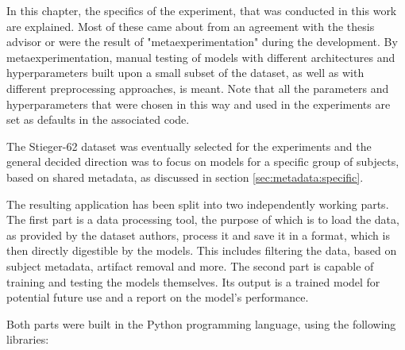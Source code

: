 \documentclass[english, he, bc, kiv, iso690alph]{fasthesis}
\begin{document}
In this chapter, the specifics of the experiment, that was conducted in this work are explained. Most of these came about from an agreement with the thesis advisor or were the result of "metaexperimentation" during the development. By metaexperimentation, manual testing of models with different architectures and hyperparameters built upon a small subset of the dataset, as well as with different preprocessing approaches, is meant. Note that all the parameters and hyperparameters that were chosen in this way and used in the experiments are set as defaults in the associated code.

The Stieger-62 dataset was eventually selected for the experiments and the general decided direction was to focus on models for a specific group of subjects, based on shared metadata, as discussed in section \ref{sec:metadata:specific}.

The resulting application has been split into two independently working parts. The first part is a data processing tool, the purpose of which is to load the data, as provided by the dataset authors, process it and save it in a format, which is then directly digestible by the models. This includes filtering the data, based on subject metadata, artifact removal and more. The second part is capable of training and testing the models themselves. Its output is a trained model for potential future use and a report on the model's performance.

Both parts were built in the Python programming language, using the following libraries:
\end{document}
